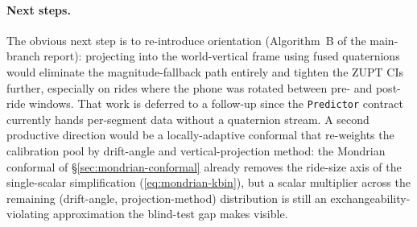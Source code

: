 \paragraph{Next steps.} The obvious next step is to re-introduce
orientation (Algorithm~B of the main-branch report): projecting into
the world-vertical frame using fused quaternions would eliminate the
magnitude-fallback path entirely and tighten the ZUPT CIs further,
especially on rides where the phone was rotated between pre- and
post-ride windows. That work is deferred to a follow-up since the
\texttt{Predictor} contract currently hands per-segment data without
a quaternion stream. A second productive direction would be a
locally-adaptive conformal that re-weights the calibration pool by
drift-angle and vertical-projection method: the Mondrian conformal of
\S\ref{sec:mondrian-conformal} already removes the ride-size axis of
the single-scalar simplification (\eqref{eq:mondrian-kbin}), but a
scalar multiplier across the remaining (drift-angle, projection-method)
distribution is still an exchangeability-violating approximation the
blind-test gap makes visible.
